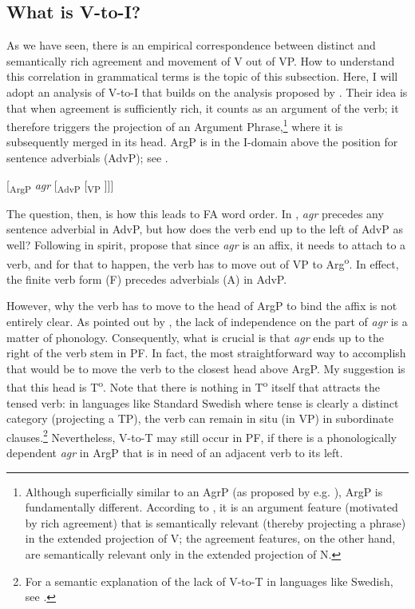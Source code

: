 \documentclass[output=paper,colorlinks,citecolor=brown,draft,draftmode]{langscibook}
\begin{document}
\subsection{What is V-to-I?}\label{sec:petzell:5.1}


As we have seen, there is an empirical correspondence between distinct and semantically rich agreement and movement of V out of VP. How to understand this correlation in grammatical terms is the topic of this subsection. Here, I will adopt an analysis of V-to-I that builds on the analysis proposed by \citet{KoenemanZeijlstra2014}. Their idea is that when agreement is sufficiently rich, it counts as an argument of the verb; it therefore triggers the projection of an Argument Phrase,\footnote{Although superficially similar to an AgrP (as proposed by e.g. \citealt{Chomsky1995}), ArgP is fundamentally different. According to \citet[600]{KoenemanZeijlstra2014}, it is an argument feature (motivated by rich agreement) that is semantically relevant (thereby projecting a phrase) in the extended projection of V; the agreement features, on the other hand, are semantically relevant only in the extended projection of N.} where it is subsequently merged in its head. ArgP is in the I-domain above the position for sentence adverbials (AdvP); see .


\ea\label{ex:petzell:30}
[\textsubscript{ArgP} \textit{agr} [\textsubscript{AdvP} [\textsubscript{VP} ]]]\\
\z

The question, then, is how this leads to FA word order. In , \textit{agr} precedes any sentence adverbial in AdvP, but how does the verb end up to the left of AdvP as well? Following \citet{Rohrbacher1999} in spirit, \citet[601]{KoenemanZeijlstra2014} propose that since \textit{agr} is an affix, it needs to attach to a verb, and for that to happen, the verb has to move out of VP to Arg\textsuperscript{o}. In effect, the finite verb form (F) precedes adverbials (A) in AdvP.



However, why the verb has to move to the head of ArgP to bind the affix is not entirely clear. As pointed out by \citet{KoenemanZeijlstra2014}, the lack of independence on the part of \textit{agr} is a matter of phonology. Consequently, what is crucial is that \textit{agr} ends up to the right of the verb stem in PF. In fact, the most straightforward way to accomplish that would be to move the verb to the closest head above ArgP. My suggestion is that this head is T\textsuperscript{o}. Note that there is nothing in T\textsuperscript{o} itself that attracts the tensed verb: in languages like Standard Swedish where tense is clearly a distinct category (projecting a TP), the verb can remain in situ (in VP) in subordinate clauses.\footnote{For a semantic explanation of the lack of V-to-T in languages like Swedish, see \citet{Zeijlstra2012}.}  Nevertheless, V-to-T may still occur in PF, if there is a phonologically dependent \textit{agr} in ArgP that is in need of an adjacent verb to its left.
\end{document}
